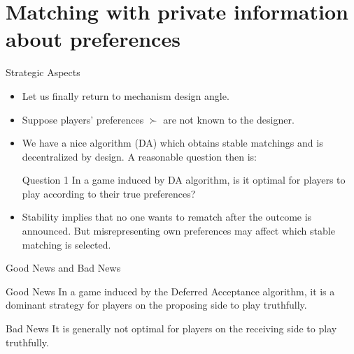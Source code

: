 \documentclass[english,10pt
,aspectratio=169
]{beamer}
\begin{document}
\section{Matching with private information about preferences}

\begin{frame}{Strategic Aspects}
\begin{itemize}
	\item Let us finally return to mechanism design angle.
	\item Suppose players' preferences $\succ$ are not known to the designer.
	\item We have a nice algorithm (DA) which obtains stable matchings and is decentralized by design. A reasonable question then is:
	\begin{block}{Question 1}
		In a game induced by DA algorithm, is it optimal for players to play according to their true preferences?
	\end{block}
	\item Stability implies that no one wants to rematch after the outcome is announced. But misrepresenting own preferences may affect which stable matching is selected.
\end{itemize}
\end{frame}


\begin{frame}{Good News and Bad News}
\begin{exampleblock}{Good News}
	In a game induced by the Deferred Acceptance algorithm, it is a dominant strategy for players on the proposing side to play truthfully.
\end{exampleblock}

\begin{alertblock}{Bad News}
	It is generally not optimal for players on the receiving side to play truthfully.
\end{alertblock}
\end{frame}
\end{document}
